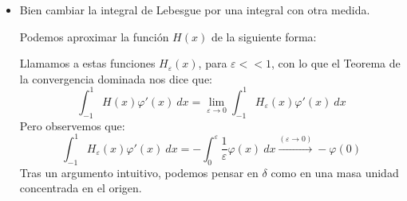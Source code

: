 \begin{itemize}
        Volviendo ahora a la fórmula~\eqref{eq:heaviside}, podemos reescribirla como:
        \begin{equation*}
            L_H(\varphi') = -L_\delta(\varphi) \qquad \forall \varphi \in C_c(-1,1)
        \end{equation*}
        o con la notación que usábamos en Análisis Funcional:
        \begin{equation*}
            \langle H,\varphi' \rangle = -\langle \delta,\varphi \rangle 
        \end{equation*}
        Conforme a la ``teoría de distribuciones'', está fórmula dice que $H' = \delta$.

        Así, la derivada débil no nos permite derivar funciones de salto, pero existe una teoría mucho más profunda en la que no vamos a entrar que sí lo permite.
    \item Bien cambiar la integral de Lebesgue por una integral con otra medida.

        Podemos aproximar la función $H(x)$ de la siguiente forma:
        \begin{figure}[H]
            \centering
        \end{figure}


        \noindent
        Llamamos a estas funciones $H_\varepsilon(x)$, para $\varepsilon<<1$, con lo que el Teorema de la convergencia dominada nos dice que:
        \begin{equation*}
            \int_{-1}^{1} H(x)\varphi'(x)~dx  = \lim_{\varepsilon\to0}\int_{-1}^{1} H_\varepsilon(x)\varphi'(x)~dx  
        \end{equation*}
        Pero observemos que:
        \begin{equation*}
            \int_{-1}^{1} H_\varepsilon(x)\varphi'(x)~dx = -\int_{0}^{\varepsilon} \frac{1}{\varepsilon}\varphi(x)~dx  \stackrel{(\varepsilon\to0)}{\longrightarrow} -\varphi(0)
        \end{equation*}
        Tras un argumento intuitivo, podemos pensar en $\delta$ como en una masa unidad concentrada en el origen.


\end{itemize}
